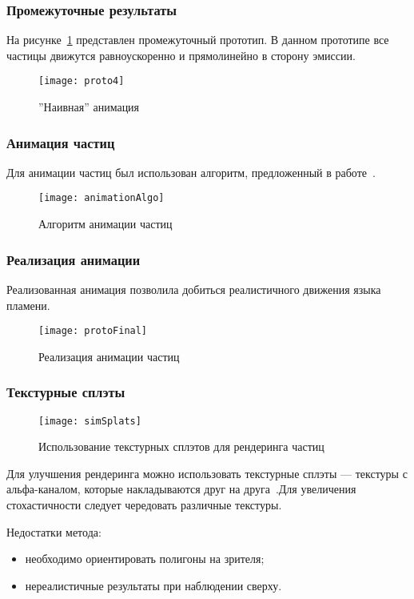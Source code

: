 \begin{frame}
\frametitle{Промежуточные результаты}
На рисунке~\ref{fig:proto4} представлен промежуточный прототип. В данном
прототипе все частицы движутся равноускоренно и прямолинейно в сторону эмиссии.
\begin{figure}[htb]
	\centering
    \texttt{[image: proto4]}
    \caption{''Наивная'' анимация}%
    \label{fig:proto4}
\end{figure}
\end{frame}

\begin{frame}
\frametitle{Анимация частиц}
Для анимации частиц был использован алгоритм, предложенный
в работе~\cite{Somasekaran2005UsingPS}.
\begin{figure}[htb]
	\centering
    \texttt{[image: animationAlgo]}
    \caption{Алгоритм анимации частиц}%
    \label{fig:animationAlgo}
\end{figure}
\end{frame}

\begin{frame}
\frametitle{Реализация анимации}
Реализованная анимация позволила добиться реалистичного движения языка пламени.
\begin{figure}[htb]
	\centering
    \texttt{[image: protoFinal]}
    \caption{Реализация анимации частиц}%
    \label{fig:protoFinal}
\end{figure}
\end{frame}

\begin{frame}[t]
\frametitle{Текстурные сплэты}
\begin{wrapfigure}{r}{0.3\textwidth}
	\centering
    \texttt{[image: simSplats]}
    \caption{Использование текстурных сплэтов для рендеринга частиц}%
    \label{fig:protoFinal}
\end{wrapfigure}
Для улучшения рендеринга можно использовать текстурные сплэты --- текстуры с
альфа-каналом, которые накладываются друг на друга~\cite{FireSplats}.Для
увеличения стохастичности следует чередовать различные текстуры.

Недостатки метода:
\begin{itemize}
    \item необходимо ориентировать полигоны на зрителя;
    \item нереалистичные результаты при наблюдении сверху.
\end{itemize}
\end{frame}

